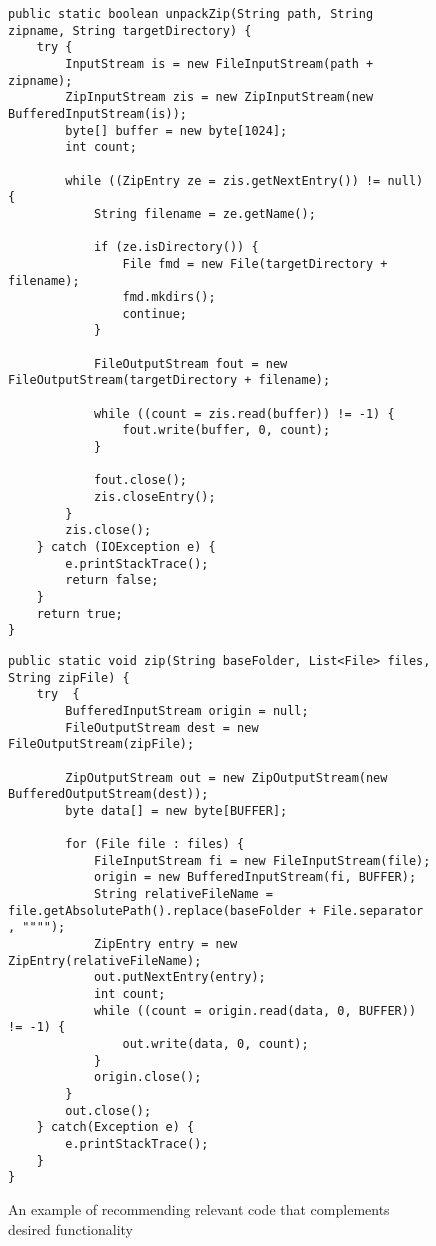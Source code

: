 \begin{figure*}[!t]
\begin{minipage}[t]{0.5\linewidth}
\begin{lstlisting}[style=MyJavaSmallStyle, caption={Query code: unpacking a zip file}, label={lst:mot-query}]
public static boolean unpackZip(String path, String zipname, String targetDirectory) {
	try {
		InputStream is = new FileInputStream(path + zipname);
		ZipInputStream zis = new ZipInputStream(new BufferedInputStream(is));
		byte[] buffer = new byte[1024];
		int count;

		while ((ZipEntry ze = zis.getNextEntry()) != null) {
			String filename = ze.getName();

			if (ze.isDirectory()) {
				File fmd = new File(targetDirectory + filename);
				fmd.mkdirs();
				continue;
			}

			FileOutputStream fout = new FileOutputStream(targetDirectory + filename);

			while ((count = zis.read(buffer)) != -1) {
				fout.write(buffer, 0, count);
			}

			fout.close();
			zis.closeEntry();
		}
		zis.close();
	} catch (IOException e) {
		e.printStackTrace();
		return false;
	}
	return true;
}
\end{lstlisting}
\end{minipage}
%
\begin{minipage}[t]{0.5\linewidth}
\begin{lstlisting}[style=MyJavaSmallStyle, caption={Related code: zipping a file}, label={lst:mot-related}]
public static void zip(String baseFolder, List<File> files, String zipFile) {
	try  {
		BufferedInputStream origin = null;
		FileOutputStream dest = new FileOutputStream(zipFile);

		ZipOutputStream out = new ZipOutputStream(new BufferedOutputStream(dest));
		byte data[] = new byte[BUFFER];

		for (File file : files) {
			FileInputStream fi = new FileInputStream(file);
			origin = new BufferedInputStream(fi, BUFFER);
			String relativeFileName = file.getAbsolutePath().replace(baseFolder + File.separator , """");
			ZipEntry entry = new ZipEntry(relativeFileName);
			out.putNextEntry(entry);
			int count;
			while ((count = origin.read(data, 0, BUFFER)) != -1) {
				out.write(data, 0, count);
			}
			origin.close();
		}
		out.close();
	} catch(Exception e) {
		e.printStackTrace();
	}
}
\end{lstlisting}
\end{minipage}
\caption{An example of recommending relevant code that complements desired functionality}
\label{fig:example}
\end{figure*}